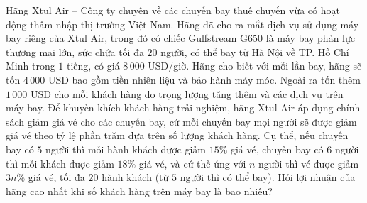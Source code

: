 \begin{ex}%
	Hãng Xtul Air -- Công ty chuyên về các chuyến bay thuê chuyến vừa có hoạt động thâm nhập thị trường Việt Nam. Hãng đã cho ra mắt dịch vụ sử dụng máy bay riêng của Xtul Air, trong đó có chiếc Gulfstream G650 là máy bay phản lực thương mại lớn, sức chứa tối đa $20$ người, có thể bay từ Hà Nội về TP. Hồ Chí Minh trong $1$ tiếng, có giá $8\,000$ USD/giờ. Hãng cho biết với mỗi lần bay, hãng sẽ tốn $4\,000$ USD bao gồm tiền nhiên liệu và bảo hành máy móc. Ngoài ra tốn thêm $1\,000$ USD cho mỗi khách hàng do trọng lượng tăng thêm và các dịch vụ trên máy bay. Để khuyến khích khách hàng trải nghiệm, hãng Xtul Air áp dụng chính sách giảm giá vé cho các chuyến bay, cứ mỗi chuyến bay mọi người sẽ được giảm giá vé theo tỷ lệ phần trăm dựa trên số lượng khách hàng. Cụ thể, nếu chuyến bay có $5$ người thì mỗi hành khách được giảm $15\%$ giá vé, chuyến bay có $6$ người thì mỗi khách được giảm $18\%$ giá vé, và cứ thế ứng với $n$ người thì vé được giảm $3n\%$ giá vé, tối đa $20$ hành khách (từ $5$ người thì có thể bay). Hỏi lợi nhuận của hãng cao nhất khi số khách hàng trên máy bay là bao nhiêu?
\end{ex}
